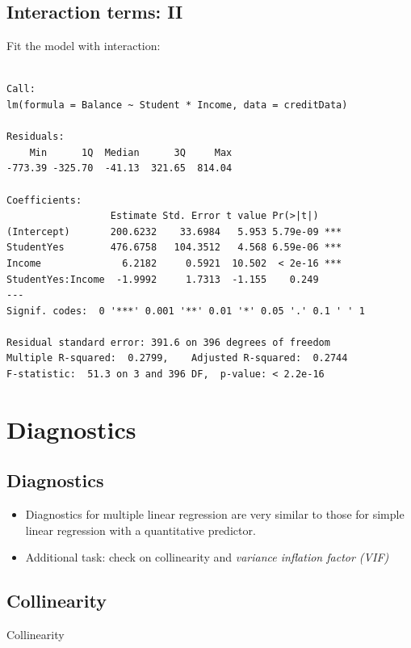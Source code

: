 \documentclass[]{article}
\providecommand{\tightlist}{%
  \setlength{\itemsep}{0pt}\setlength{\parskip}{0pt}}
\begin{document}
\subsection{Interaction terms: II}\label{interaction-terms-ii-2}

Fit the model with interaction:

\begin{verbatim}

Call:
lm(formula = Balance ~ Student * Income, data = creditData)

Residuals:
    Min      1Q  Median      3Q     Max 
-773.39 -325.70  -41.13  321.65  814.04 

Coefficients:
                  Estimate Std. Error t value Pr(>|t|)    
(Intercept)       200.6232    33.6984   5.953 5.79e-09 ***
StudentYes        476.6758   104.3512   4.568 6.59e-06 ***
Income              6.2182     0.5921  10.502  < 2e-16 ***
StudentYes:Income  -1.9992     1.7313  -1.155    0.249    
---
Signif. codes:  0 '***' 0.001 '**' 0.01 '*' 0.05 '.' 0.1 ' ' 1

Residual standard error: 391.6 on 396 degrees of freedom
Multiple R-squared:  0.2799,    Adjusted R-squared:  0.2744 
F-statistic:  51.3 on 3 and 396 DF,  p-value: < 2.2e-16
\end{verbatim}

\section{Diagnostics}\label{diagnostics-1}

\subsection{Diagnostics}\label{diagnostics-2}

\begin{itemize}
\tightlist
\item
  Diagnostics for multiple linear regression are very similar to those
  for simple linear regression with a quantitative predictor.
\item
  Additional task: check on collinearity and \emph{variance inflation
  factor (VIF)}
\end{itemize}

\subsection{Collinearity}\label{collinearity}

Collinearity
\end{document}
